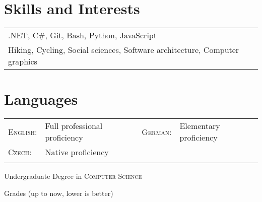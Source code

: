\documentclass[a4paper,10pt]{article}
\newcommand{\comment}[2]{#2}
\begin{document}
\section{Skills and Interests}
\begin{tabular}{l} 
.NET, C\#, Git, Bash, Python, JavaScript \\
Hiking, Cycling, Social sciences, Software architecture, Computer graphics \\
\end{tabular}

\section{Languages}
\begin{tabular}{llll}
\textsc{English:} & Full professional proficiency &
\textsc{German:} & Elementary proficiency \\
\textsc{Czech:} & Native proficiency \\&
\end{tabular}


\newpage
\par{\centering\Large \hypertarget{bscMFF}{Undergraduate \comment{Bachelor of Science}  Degree in \textsc{Computer Science}}\par}\large{\centering Grades (up to now, lower is better)\par}\normalsize
\end{document}

